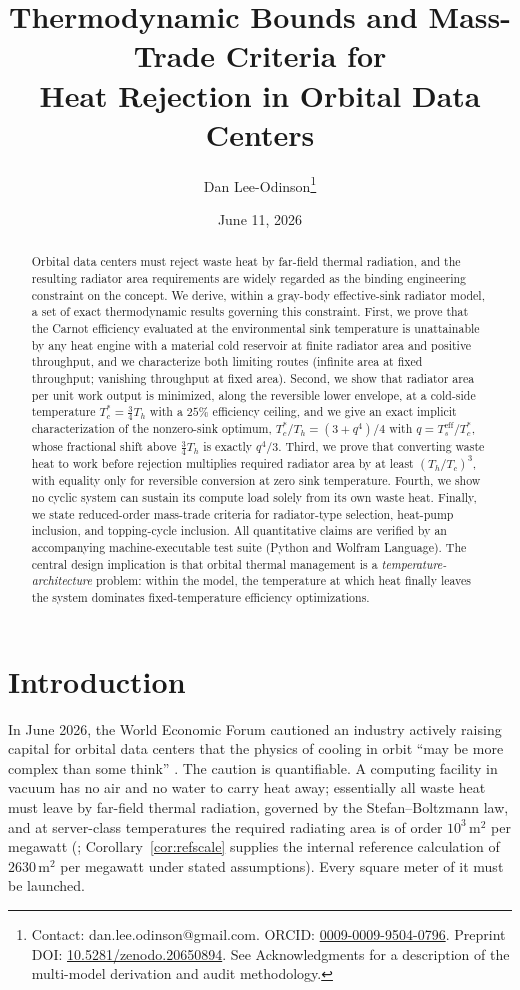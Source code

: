 \documentclass[11pt]{article}
\title{Thermodynamic Bounds and Mass-Trade Criteria for\\ Heat Rejection in Orbital Data Centers}
\author{Dan Lee-Odinson\thanks{Contact: dan.lee.odinson@gmail.com. ORCID: \href{https://orcid.org/0009-0009-9504-0796}{0009-0009-9504-0796}. Preprint DOI: \href{https://doi.org/10.5281/zenodo.20650894}{10.5281/zenodo.20650894}. See Acknowledgments for a description of the multi-model derivation and audit methodology.}}
\date{June 11, 2026}
\theoremstyle{definition}
\theoremstyle{remark}
\newcommand{\Th}{T_h}
\newcommand{\Tc}{T_c}
\newcommand{\Ts}{T_s^{\mathrm{eff}}}
\begin{document}
\maketitle

\begin{abstract}
Orbital data centers must reject waste heat by far-field thermal radiation, and the resulting radiator area requirements are widely regarded as the binding engineering constraint on the concept. We derive, within a gray-body effective-sink radiator model, a set of exact thermodynamic results governing this constraint. First, we prove that the Carnot efficiency evaluated at the environmental sink temperature is unattainable by any heat engine with a material cold reservoir at finite radiator area and positive throughput, and we characterize both limiting routes (infinite area at fixed throughput; vanishing throughput at fixed area). Second, we show that radiator area per unit work output is minimized, along the reversible lower envelope, at a cold-side temperature $\Tc^{*}=\tfrac{3}{4}\Th$ with a $25\%$ efficiency ceiling, and we give an exact implicit characterization of the nonzero-sink optimum, $\Tc^{*}/\Th=(3+q^{4})/4$ with $q=\Ts/\Tc^{*}$, whose fractional shift above $\tfrac{3}{4}\Th$ is exactly $q^{4}/3$. Third, we prove that converting waste heat to work before rejection multiplies required radiator area by at least $(\Th/\Tc)^{3}$, with equality only for reversible conversion at zero sink temperature. Fourth, we show no cyclic system can sustain its compute load solely from its own waste heat. Finally, we state reduced-order mass-trade criteria for radiator-type selection, heat-pump inclusion, and topping-cycle inclusion. All quantitative claims are verified by an accompanying machine-executable test suite (Python and Wolfram Language). The central design implication is that orbital thermal management is a \emph{temperature-architecture} problem: within the model, the temperature at which heat finally leaves the system dominates fixed-temperature efficiency optimizations.
\end{abstract}

\section{Introduction}

In June 2026, the World Economic Forum cautioned an industry actively raising capital for orbital data centers that the physics of cooling in orbit ``may be more complex than some think'' \cite{wef2026}. The caution is quantifiable. A computing facility in vacuum has no air and no water to carry heat away; essentially all waste heat must leave by far-field thermal radiation, governed by the Stefan--Boltzmann law, and at server-class temperatures the required radiating area is of order $10^{3}\,\mathrm{m^{2}}$ per megawatt (\cite{eetimes2026}; Corollary~\ref{cor:refscale} supplies the internal reference calculation of $2630\,\mathrm{m^{2}}$ per megawatt under stated assumptions). Every square meter of it must be launched.
\end{document}
